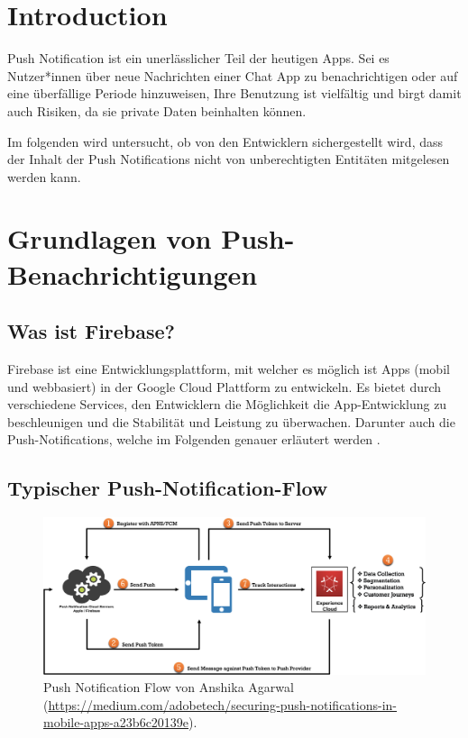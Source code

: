 \documentclass[sigconf]{acmart}
\begin{document}
\maketitle

\section{Introduction}

Push Notification ist ein unerlässlicher Teil der heutigen Apps. 
Sei es Nutzer*innen über neue Nachrichten einer Chat App 
zu benachrichtigen oder auf eine überfällige Periode hinzuweisen, 
Ihre Benutzung ist vielfältig und birgt damit auch Risiken, da sie 
private Daten beinhalten können.

Im folgenden wird untersucht, ob von den Entwicklern
sichergestellt wird, dass der Inhalt der
Push Notifications nicht von unberechtigten Entitäten mitgelesen 
werden kann.

\section{Grundlagen von Push-Benachrichtigungen}

\subsection{Was ist Firebase?}

Firebase ist eine Entwicklungsplattform, mit welcher es möglich ist 
Apps (mobil und webbasiert) in der Google Cloud Plattform zu entwickeln.
Es bietet durch verschiedene Services, den Entwicklern die Möglichkeit 
die App-Entwicklung zu beschleunigen und die Stabilität und Leistung 
zu überwachen. Darunter auch die Push-Notifications, welche im Folgenden 
genauer erläutert werden \cite{cloudwuerdig}.

\subsection{Typischer Push-Notification-Flow}

\begin{figure}[h]
  \centering
  \includegraphics[width=\linewidth]{sample-flow}
  \caption{Push Notification Flow von Anshika Agarwal (\url{https://medium.com/adobetech/securing-push-notifications-in-mobile-apps-a23b6c20139e}).}
\end{figure}
\end{document}
